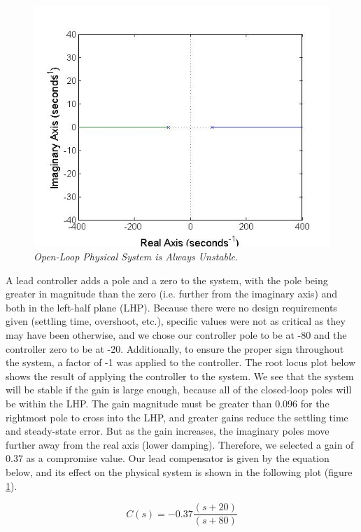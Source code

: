 \documentclass{article}
\theoremstyle{plain}
\theoremstyle{definition}
\theoremstyle{remark}
\begin{document}
\begin{figure}[h!]
\begin{center}
\includegraphics[width = 12cm]{FigureA.jpg}
\caption{\emph{Open-Loop Physical System is Always Unstable.}}
\label{Q2}
\end{center}
\end{figure}

A lead controller adds a pole and a zero to the system, with the pole being greater in magnitude than the zero (i.e. further from the imaginary axis) and both in the left-half plane (LHP). Because there were no design requirements given (settling time, overshoot, etc.), specific values were not as critical as they may have been otherwise, and we chose our controller pole to be at -80 and the controller zero to be at -20. Additionally, to ensure the proper sign throughout the system, a factor of -1 was applied to the controller. The root locus plot below shows the result of applying the controller to the system. We see that the system will be stable if the gain is large enough, because all of the closed-loop poles will be within the LHP. The gain magnitude must be greater than 0.096 for the rightmost pole to cross into the LHP, and greater gains reduce the settling time and steady-state error. But as the gain increases, the imaginary poles move further away from the real axis (lower damping). Therefore, we selected a gain of 0.37 as a compromise value. Our lead compensator is given by the equation below, and its effect on the physical system is shown in the following plot (figure \ref{Q2}). 

$$C(s)= -0.37 \frac{(s+20)}{(s+80)}$$
\end{document}
